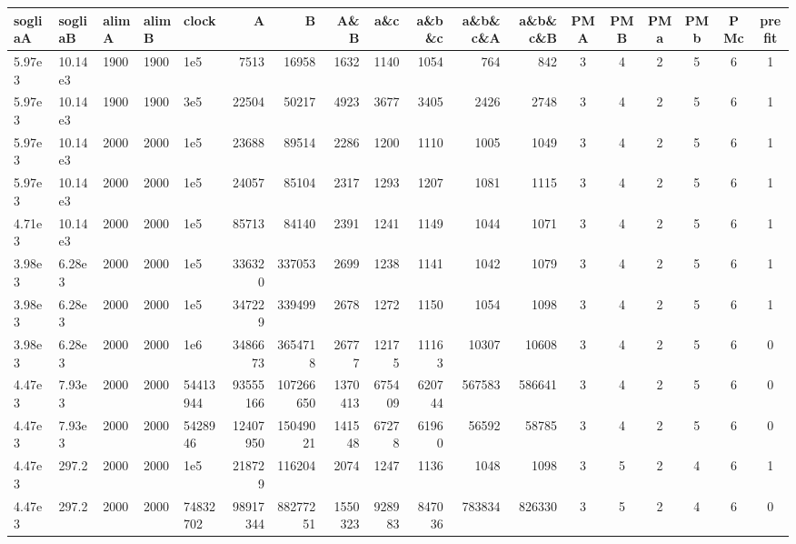 \begin{landscape}
	\begin{table}[p]
		\centering
		\small
		\begin{tabular}{llll|lrrrrrrr|ccccc|c}
			sogliaA & sogliaB & alimA & alimB & clock & A & B & A\&B & a\&c & a\&b\&c & a\&b\&c\&A & a\&b\&c\&B & PMA & PMB & PMa & PMb & PMc & prefit \\
			\hline\hline
			5.97e3 & 10.14e3 & 1900 & 1900 & 1e5 & 7513 & 16958 & 1632 & 1140 & 1054 & 764 & 842 & 3 & 4 & 2 & 5 & 6 & 1                          \\
			5.97e3 & 10.14e3 & 1900 & 1900 & 3e5 & 22504 & 50217 & 4923 & 3677 & 3405 & 2426 & 2748 & 3 & 4 & 2 & 5 & 6 & 1                       \\
			5.97e3 & 10.14e3 & 2000 & 2000 & 1e5 & 23688 & 89514 & 2286 & 1200 & 1110 & 1005 & 1049 & 3 & 4 & 2 & 5 & 6 & 1                       \\
			5.97e3 & 10.14e3 & 2000 & 2000 & 1e5 & 24057 & 85104 & 2317 & 1293 & 1207 & 1081 & 1115 & 3 & 4 & 2 & 5 & 6 & 1                       \\
			4.71e3 & 10.14e3 & 2000 & 2000 & 1e5 & 85713 & 84140 & 2391 & 1241 & 1149 & 1044 & 1071 & 3 & 4 & 2 & 5 & 6 & 1                       \\
			3.98e3 & 6.28e3 & 2000 & 2000 & 1e5 & 336320 & 337053 & 2699 & 1238 & 1141 & 1042 & 1079 & 3 & 4 & 2 & 5 & 6 & 1                      \\
			3.98e3 & 6.28e3 & 2000 & 2000 & 1e5 & 347229 & 339499 & 2678 & 1272 & 1150 & 1054 & 1098 & 3 & 4 & 2 & 5 & 6 & 1                      \\
			3.98e3 & 6.28e3 & 2000 & 2000 & 1e6 & 3486673 & 3654718 & 26777 & 12175 & 11163 & 10307 & 10608 & 3 & 4 & 2 & 5 & 6 & 0               \\
			4.47e3 & 7.93e3 & 2000 & 2000 & 54413944 & 93555166 & 107266650 & 1370413 & 675409 & 620744 & 567583 & 586641 & 3 & 4 & 2 & 5 & 6 & 0 \\
			4.47e3 & 7.93e3 & 2000 & 2000 & 5428946 & 12407950 & 15049021 & 141548 & 67278 & 61960 & 56592 & 58785 & 3 & 4 & 2 & 5 & 6 & 0        \\
			\hline
			4.47e3 & 297.2 & 2000 & 2000 & 1e5 & 218729 & 116204 & 2074 & 1247 & 1136 & 1048 & 1098 & 3 & 5 & 2 & 4 & 6 & 1                       \\
			4.47e3 & 297.2 & 2000 & 2000 & 74832702 & 98917344 & 88277251 & 1550323 & 928983 & 847036 & 783834 & 826330 & 3 & 5 & 2 & 4 & 6 & 0   \\

\end{tabular}
\end{table}
\end{landscape}

